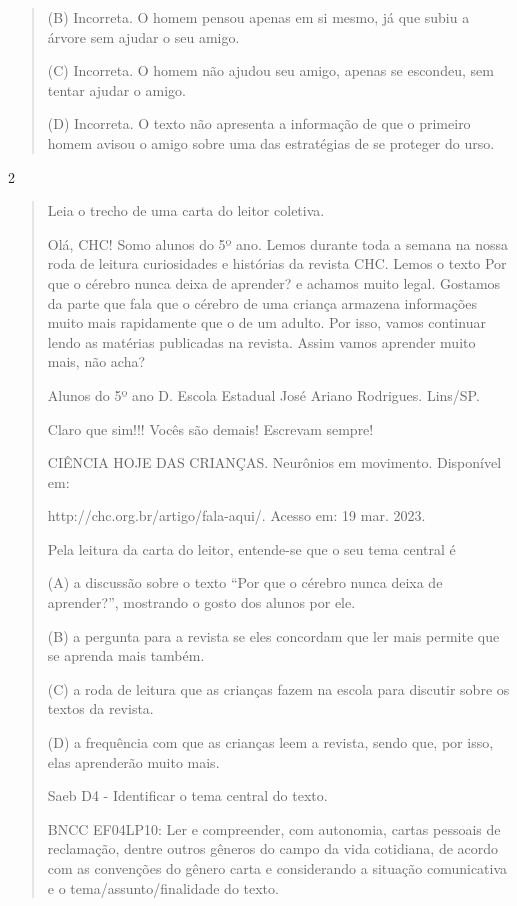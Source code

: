 \begin{escolha}
\begin{quote}
(B) Incorreta. O homem pensou apenas em si mesmo, já que subiu a árvore
sem ajudar o seu amigo.

(C) Incorreta. O homem não ajudou seu amigo, apenas se escondeu, sem
tentar ajudar o amigo.

(D) Incorreta. O texto não apresenta a informação de que o primeiro
homem avisou o amigo sobre uma das estratégias de se proteger do urso.
\end{quote}

\num{2}

\begin{quote}
Leia o trecho de uma carta do leitor coletiva.

Olá, CHC! Somo alunos do 5º ano. Lemos durante toda a semana na nossa
roda de leitura curiosidades e histórias da revista CHC. Lemos o texto
Por que o cérebro nunca deixa de aprender? e achamos muito legal.
Gostamos da parte que fala que o cérebro de uma criança armazena
informações muito mais rapidamente que o de um adulto. Por isso, vamos
continuar lendo as matérias publicadas na revista. Assim vamos aprender
muito mais, não acha?

Alunos do 5º ano D. Escola Estadual José Ariano Rodrigues. Lins/SP.

Claro que sim!!! Vocês são demais! Escrevam sempre!

CIÊNCIA HOJE DAS CRIANÇAS. Neurônios em movimento. Disponível em:

http://chc.org.br/artigo/fala-aqui/. Acesso em: 19 mar. 2023.

Pela leitura da carta do leitor, entende-se que o seu tema central é

(A) a discussão sobre o texto ``Por que o cérebro nunca deixa de
aprender?'', mostrando o gosto dos alunos por ele.

(B) a pergunta para a revista se eles concordam que ler mais permite que
se aprenda mais também.

(C) a roda de leitura que as crianças fazem na escola para discutir
sobre os textos da revista.

(D) a frequência com que as crianças leem a revista, sendo que, por
isso, elas aprenderão muito mais.

Saeb D4 - Identificar o tema central do texto.

BNCC EF04LP10: Ler e compreender, com autonomia, cartas pessoais de
reclamação, dentre outros gêneros do campo da vida cotidiana, de acordo
com as convenções do gênero carta e considerando a situação comunicativa
e o tema/assunto/finalidade do texto.


\end{quote}
\end{escolha}
